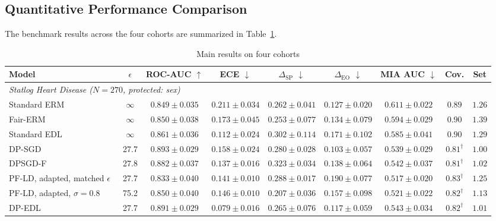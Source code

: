 \documentclass[pdflatex,sn-vancouver-num,referee,lineno]{sn-jnl}
\theoremstyle{thmstyleone}
\theoremstyle{thmstylethree}
\begin{document}
\subsection{Quantitative Performance Comparison}
The benchmark results across the four cohorts are summarized in Table~\ref{tab:main_results}.

\begin{table}
\centering
\small
\caption{Main results on four cohorts}
\label{tab:main_results}
\begingroup\scriptsize\setlength{\tabcolsep}{2.5pt}
\begin{tabular}{lcccccccc}
\toprule
\textbf{Model} & $\epsilon$ & \textbf{ROC-AUC} $\uparrow$ & \textbf{ECE} $\downarrow$ & $\Delta_{\text{SP}}$ $\downarrow$ & $\Delta_{\text{EO}}$ $\downarrow$ & \textbf{MIA AUC} $\downarrow$ & \textbf{Cov.} & \textbf{Set} \\
\midrule
\multicolumn{9}{l}{\emph{Statlog Heart Disease ($N=270$, protected: sex)}} \\
Standard ERM & $\infty$ & $0.849 \pm 0.035$ & $0.211 \pm 0.034$ & $0.262 \pm 0.041$ & $0.127 \pm 0.020$ & $0.611 \pm 0.022$ & $0.89$ & $1.26$ \\
Fair-ERM & $\infty$ & $0.850 \pm 0.038$ & $0.173 \pm 0.045$ & $0.253 \pm 0.077$ & $0.134 \pm 0.079$ & $0.594 \pm 0.029$ & $0.90$ & $1.39$ \\
Standard EDL & $\infty$ & $0.861 \pm 0.036$ & $0.112 \pm 0.024$ & $0.302 \pm 0.114$ & $0.171 \pm 0.102$ & $0.585 \pm 0.041$ & $0.90$ & $1.29$ \\
DP-SGD & 27.7 & $\mathbf{0.893} \pm \mathbf{0.029}$ & $0.158 \pm 0.024$ & $0.280 \pm 0.028$ & $\mathbf{0.103} \pm \mathbf{0.057}$ & $0.539 \pm 0.029$ & $0.81^\dagger$ & $1.00$ \\
DPSGD-F~\cite{xu2021removing} & 27.8 & $0.882 \pm 0.037$ & $0.137 \pm 0.016$ & $0.323 \pm 0.034$ & $0.138 \pm 0.064$ & $0.542 \pm 0.037$ & $0.81^\dagger$ & $1.02$ \\
PF-LD, adapted, matched $\epsilon$~\cite{tran2021differentially} & 27.7 & $0.833 \pm 0.040$ & $0.141 \pm 0.010$ & $0.288 \pm 0.017$ & $0.190 \pm 0.077$ & $\mathbf{0.517} \pm \mathbf{0.020}$ & $0.83^\dagger$ & $1.25$ \\
PF-LD, adapted, $\sigma=0.8$~\cite{tran2021differentially} & 75.2 & $0.850 \pm 0.040$ & $0.146 \pm 0.010$ & $0.207 \pm 0.036$ & $0.157 \pm 0.098$ & $0.521 \pm 0.022$ & $0.82^\dagger$ & $1.13$ \\
DP-EDL & 27.7 & $0.891 \pm 0.029$ & $\mathbf{0.079} \pm \mathbf{0.016}$ & $\mathbf{0.265} \pm \mathbf{0.076}$ & $0.117 \pm 0.059$ & $0.543 \pm 0.034$ & $0.82^\dagger$ & $1.01$ \\

\end{tabular}
\end{table}
\end{document}
